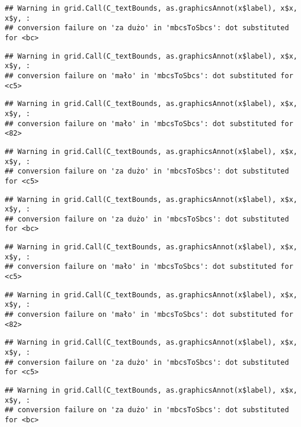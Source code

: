 \documentclass[
]{book}
\begin{document}
\begin{verbatim}
## Warning in grid.Call(C_textBounds, as.graphicsAnnot(x$label), x$x, x$y, :
## conversion failure on 'za dużo' in 'mbcsToSbcs': dot substituted for <bc>
\end{verbatim}

\begin{verbatim}
## Warning in grid.Call(C_textBounds, as.graphicsAnnot(x$label), x$x, x$y, :
## conversion failure on 'mało' in 'mbcsToSbcs': dot substituted for <c5>
\end{verbatim}

\begin{verbatim}
## Warning in grid.Call(C_textBounds, as.graphicsAnnot(x$label), x$x, x$y, :
## conversion failure on 'mało' in 'mbcsToSbcs': dot substituted for <82>
\end{verbatim}

\begin{verbatim}
## Warning in grid.Call(C_textBounds, as.graphicsAnnot(x$label), x$x, x$y, :
## conversion failure on 'za dużo' in 'mbcsToSbcs': dot substituted for <c5>
\end{verbatim}

\begin{verbatim}
## Warning in grid.Call(C_textBounds, as.graphicsAnnot(x$label), x$x, x$y, :
## conversion failure on 'za dużo' in 'mbcsToSbcs': dot substituted for <bc>
\end{verbatim}

\begin{verbatim}
## Warning in grid.Call(C_textBounds, as.graphicsAnnot(x$label), x$x, x$y, :
## conversion failure on 'mało' in 'mbcsToSbcs': dot substituted for <c5>
\end{verbatim}

\begin{verbatim}
## Warning in grid.Call(C_textBounds, as.graphicsAnnot(x$label), x$x, x$y, :
## conversion failure on 'mało' in 'mbcsToSbcs': dot substituted for <82>
\end{verbatim}

\begin{verbatim}
## Warning in grid.Call(C_textBounds, as.graphicsAnnot(x$label), x$x, x$y, :
## conversion failure on 'za dużo' in 'mbcsToSbcs': dot substituted for <c5>
\end{verbatim}

\begin{verbatim}
## Warning in grid.Call(C_textBounds, as.graphicsAnnot(x$label), x$x, x$y, :
## conversion failure on 'za dużo' in 'mbcsToSbcs': dot substituted for <bc>
\end{verbatim}
\end{document}
